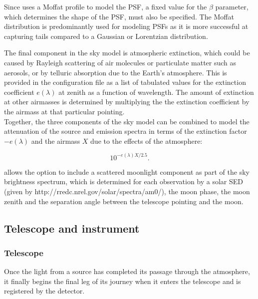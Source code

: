 Since  uses a Moffat profile to model the PSF, a fixed value for the $\beta$ parameter, which determines the shape of the PSF, must also be specified. The Moffat distribution is predominantly used for modeling PSFs as it is more successful at capturing tails compared to a Gaussian or Lorentzian distribution.

The final component in the sky model is atmospheric extinction, which could be caused by Rayleigh scattering of air molecules or particulate matter such as aerosols, or by telluric absorption due to the Earth's atmosphere. This is provided in the configuration file as a list of tabulated values for the extinction coefficient $e(\lambda)$ at zenith as a function of wavelength. The amount of extinction at other airmasses is determined by multiplying the the extinction coefficient by the airmass at that particular pointing.\\

Together, the three components of the sky model can be combined to model the attenuation of the source and emission spectra in terms of the extinction factor $-e(\lambda)$ and the airmass $X$ due to the effects of the atmosphere: 

\begin{equation}
    10^{-e(\lambda)X/2.5}.
\end{equation}

 allows the option to include a scattered moonlight component as part of the sky brightness spectrum, which is determined for each observation by a solar SED (given by http://rredc.nrel.gov/solar/spectra/am0/), the moon phase, the moon zenith and the separation angle between the telescope pointing and the moon.\\

\subsection{Telescope and instrument}

\subsubsection{Telescope}
Once the light from a source has completed its passage through the atmosphere, it finally begins the final leg of its journey when it enters the telescope and is registered by the detector.

